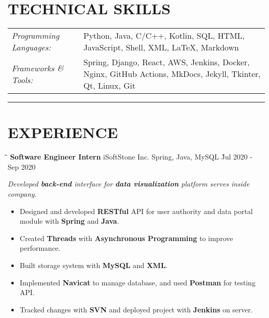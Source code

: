 \documentclass{res}
\begin{document}
\begin{resume}
\vspace{-0.2in}
\section{TECHNICAL SKILLS}  
    \vspace{+0.1in}
    \hspace{-0.12in} 
    \begin{tabular}{l p{5in}}
    {\sl Programming Languages:} & Python, Java, C/C++, Kotlin, SQL, HTML, JavaScript, 
                        Shell, XML, LaTeX, Markdown \\ 
    \rule{0in}{0.2in}
    {\sl Frameworks \& Tools:} & Spring, Django, React, AWS, Jenkins, Docker, Nginx, 
                         GitHub Actions, MkDocs, Jekyll, Tkinter, Qt, Linux, Git
    \end{tabular}   

\vspace{-5pt}
\hspace{-0.55in}
\noindent\rule[0.25\baselineskip]{19.36cm}{0.5pt}    

\vspace{-0.2in}
\section{EXPERIENCE}
    \vspace{0.00in}	
    \begin{tabbing}
    \hspace{2.6in}\= \hspace{1.5in}\= \hspace{1.6in}\= \kill %
    {\bf Software Engineer Intern} \> iSoftStone Inc. \>  
                                        Spring, Java, MySQL    \` Jul 2020 - Sep 2020\\
    \end{tabbing}\vspace{-20pt}      %
    \vspace{-0.1in}
    \textit{Developed {\bf back-end} interface for {\bf data visualization} 
                platform serves inside company.}
    \vspace{+0.05in}
    \begin{itemize} \itemsep 1.5pt %
        \item Designed and developed {\bf RESTful} API for user authority and 
                data portal module with {\bf Spring} and {\bf Java}.
        \item Created {\bf Threads} with {\bf Asynchronous Programming} to 
                improve performance.
        \item Built storage system with {\bf MySQL} and {\bf XML}.
        \item Implemented {\bf Navicat} to manage database, and used {\bf Postman} for testing API.
        \item Tracked changes with {\bf SVN} and deployed project with {\bf Jenkins} 
                on server.
    \end{itemize}


\end{resume}
\end{document}
